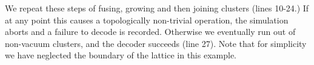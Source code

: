 \documentclass[aps, prl, letterpaper, twocolumn, superscriptaddress, notitlepage, 10pt]{revtex4-1}
\begin{document}
We repeat these steps of fusing, growing and then joining clusters (lines 10-24.)
If at any point this causes a topologically 
non-trivial operation, the simulation aborts and a failure
to decode is recorded.
Otherwise we eventually run out
of non-vacuum clusters, and the decoder succeeds (line 27).
Note that for simplicity we have neglected the boundary of the lattice in
this example.


%
%
%
%
%
%
%



\end{document}
